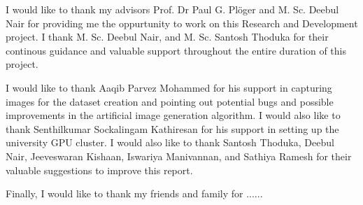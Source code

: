 \documentclass[rnd]{mas_report}
\begin{document}
\begin{acknowledgements}
I would like to thank my advisors Prof. Dr Paul G. Pl\"oger and M. Sc. Deebul Nair for providing me the oppurtunity to work on this Research and Development project. I thank M. Sc. Deebul Nair, and M. Sc. Santosh Thoduka for their continous guidance and valuable support throughout the entire duration of this project.

I would like to thank Aaqib Parvez Mohammed for his support in capturing images for the dataset creation and pointing out potential bugs and possible improvements in the artificial image generation algorithm. I would also like to thank Senthilkumar Sockalingam Kathiresan for his support in setting up the university GPU cluster. I would also like to thank Santosh Thoduka, Deebul Nair, Jeeveswaran Kishaan, Iswariya Manivannan, and Sathiya Ramesh for their valuable suggestions to improve this report.

Finally, I would like to thank my friends and family for ......
\end{acknowledgements}


\tableofcontents


\mainmatter %

\pagestyle{mainmatter}










\begin{appendices}


\end{appendices}

\backmatter

\end{document}
